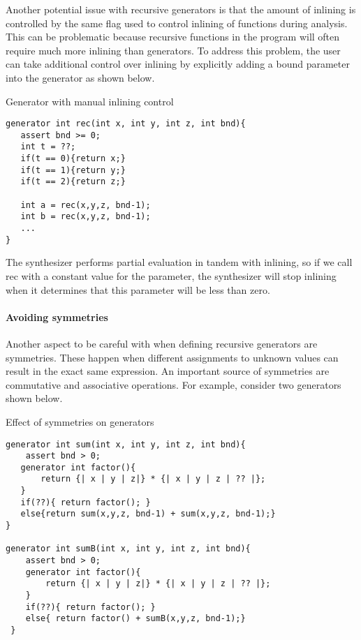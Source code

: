 Another potential issue with recursive generators is that the amount of inlining is controlled by the same flag used to control inlining of functions during analysis. This can be problematic because recursive functions in the program will often require much more inlining than generators. To address this problem, the user can take additional control over inlining by explicitly adding a bound parameter into the generator as shown below. 

\begin{Example}{Generator with manual inlining control}
\begin{lstlisting}
generator int rec(int x, int y, int z, int bnd){
   assert bnd >= 0;
   int t = ??;
   if(t == 0){return x;}   
   if(t == 1){return y;}
   if(t == 2){return z;}

   int a = rec(x,y,z, bnd-1);
   int b = rec(x,y,z, bnd-1);
   ...
}
\end{lstlisting}
\end{Example}

The synthesizer performs partial evaluation in tandem with inlining, so if we call rec with a constant value for the  parameter, the synthesizer will stop inlining when it determines that this parameter will be less than zero. 

\paragraph{Avoiding symmetries} 
Another aspect to be careful with when defining recursive generators are symmetries. These happen when different assignments to unknown values can result in the exact same expression. An important source of symmetries are commutative and associative operations. For example, consider two generators shown below. 

\begin{Example}{Effect of symmetries on generators}
\begin{lstlisting}
generator int sum(int x, int y, int z, int bnd){
    assert bnd > 0;
   generator int factor(){
       return {| x | y | z|} * {| x | y | z | ?? |};
   }
   if(??){ return factor(); }
   else{return sum(x,y,z, bnd-1) + sum(x,y,z, bnd-1);} 
}

generator int sumB(int x, int y, int z, int bnd){
    assert bnd > 0;
    generator int factor(){
        return {| x | y | z|} * {| x | y | z | ?? |};
    }
    if(??){ return factor(); }
    else{ return factor() + sumB(x,y,z, bnd-1);} 
 }
\end{lstlisting}
\end{Example}

